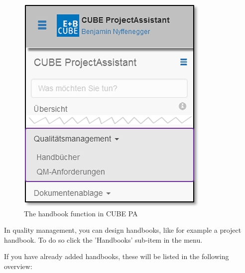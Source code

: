 \begin{figure}   %
  \vspace{-35pt}      %
  \begin{center}
    \includegraphics[width=1\linewidth]{../chapters/09_Qualitaetsmanagement/pictures/9-2_Menu_Qualitaetsmanagement_Handbuch.jpg}
  \end{center}
  \vspace{-20pt}
  \caption{The handbook function in CUBE PA}
  \vspace{-10pt}
\end{figure}

In quality management, you can design handbooks, like for example a project handbook. To do so click the 'Handbooks' sub-item in the menu.

\vspace{2.5cm}  

If you have already added handbooks, these will be listed in the following overview:\\

\vspace{3cm}  

